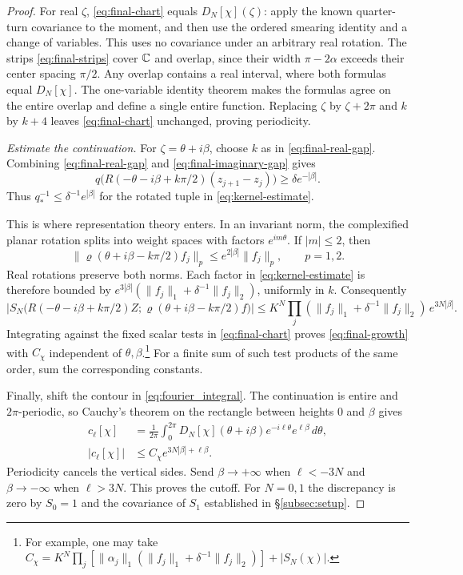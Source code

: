 \begin{proof}
For real $\zeta$, \eqref{eq:final-chart} equals $D_N[\chi](\zeta)$:
apply the known quarter-turn covariance to the moment, and then use the
ordered smearing identity and a change of variables. This uses no
covariance under an arbitrary real rotation.
The strips \eqref{eq:final-strips} cover $\mathbb{C}$ and overlap, since
their width $\pi-2\alpha$ exceeds their center spacing $\pi/2$.
Any overlap contains a real interval, where both formulas equal
$D_N[\chi]$. The one-variable identity theorem makes the
formulas agree on the entire overlap and define a single entire
function. Replacing $\zeta$ by $\zeta+2\pi$ and $k$ by $k+4$ leaves
\eqref{eq:final-chart} unchanged, proving periodicity.

\emph{Estimate the continuation.}
For $\zeta=\theta+i\beta$, choose $k$ as in
\eqref{eq:final-real-gap}. Combining \eqref{eq:final-real-gap} and
\eqref{eq:final-imaginary-gap} gives
\[
 q\bigl(R(-\theta-i\beta+k\pi/2)(z_{j+1}-z_j)\bigr)
 \ge \delta e^{-|\beta|}.
\]
Thus $q_*^{-1}\leq\delta^{-1}e^{|\beta|}$ for the rotated tuple in
\eqref{eq:kernel-estimate}.

This is where representation theory enters. In an invariant norm, the
complexified planar rotation splits into weight spaces with factors
$e^{im\theta}$. If $|m|\le2$, then
\begin{equation}\label{eq:final-tensor}
 \|\varrho(\theta+i\beta-k\pi/2)f_j\|_p
 \le e^{2|\beta|}\|f_j\|_p,\qquad p=1,2.
\end{equation}
Real rotations preserve both norms. Each factor in
\eqref{eq:kernel-estimate} is therefore bounded by
$e^{3|\beta|}(\|f_j\|_1+\delta^{-1}\|f_j\|_2)$, uniformly in $k$.
Consequently
\begin{equation}\label{eq:final-rotated-kernel}
 \left|S_N\bigl(R(-\theta-i\beta+k\pi/2)Z;
                      \varrho(\theta+i\beta-k\pi/2)f\bigr)\right|
 \le K^N\prod_j(\|f_j\|_1+\delta^{-1}\|f_j\|_2)\,e^{3N|\beta|}.
\end{equation}
Integrating against the fixed scalar tests in \eqref{eq:final-chart}
proves \eqref{eq:final-growth} with $C_\chi$ independent of
$\theta,\beta$.\footnote{For example, one may take
$C_\chi=K^N\prod_j[\|\alpha_j\|_1(\|f_j\|_1+\delta^{-1}\|f_j\|_2)]+|S_N(\chi)|$.}
For a finite sum of such test products of the same order, sum the
corresponding constants.

Finally, shift the contour in \eqref{eq:fourier_integral}. The
continuation is entire and $2\pi$-periodic, so Cauchy's theorem on
the rectangle between heights $0$ and $\beta$ gives
\begin{equation}\label{eq:final-contour}
 \begin{split}
 c_\ell[\chi]
 &=\frac1{2\pi}\int_0^{2\pi}
 D_N[\chi](\theta+i\beta)e^{-i\ell\theta}e^{\ell\beta}\,d\theta,\\
 |c_\ell[\chi]|&\le C_\chi e^{3N|\beta|+\ell\beta}.
 \end{split}
\end{equation}
Periodicity cancels the vertical sides. Send $\beta\to+\infty$ when
$\ell<-3N$ and $\beta\to-\infty$ when $\ell>3N$. This proves the cutoff.
For $N=0,1$ the discrepancy is zero by $S_0=1$ and the covariance
of $S_1$ established in \S\ref{subsec:setup}.
\end{proof}
